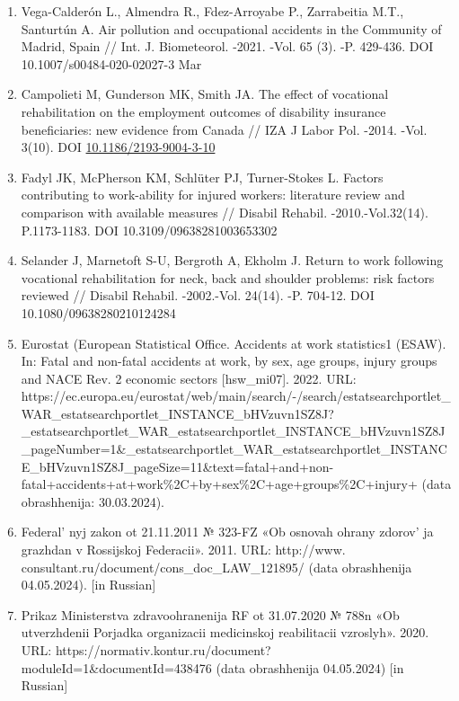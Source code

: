 \begin{references}
\begin{enumerate}
\def\labelenumi{\arabic{enumi}.}
\setcounter{enumi}{5}
\item
  Vega-Calderón L., Almendra R., Fdez-Arroyabe P., Zarrabeitia M.T.,
  Santurtún A. Air pollution and occupational accidents in the Community
  of Madrid, Spain // Int. J. Biometeorol. -2021. -Vol. 65 (3). -P.
  429-436. DOI 10.1007/s00484-020-02027-3 Mar
\item
  Campolieti M, Gunderson MK, Smith JA. The effect of vocational
  rehabilitation on the employment outcomes of disability insurance
  beneficiaries: new evidence from Canada // IZA J Labor Pol. -2014.
  -Vol. 3(10). DOI
  \href{http://dx.doi.org/10.1186/2193-9004-3-10}{10.1186/2193-9004-3-10}
\item
  Fadyl JK, McPherson KM, Schlüter PJ, Turner-Stokes L. Factors
  contributing to work-ability for injured workers: literature review
  and comparison with available measures // Disabil Rehabil.
  -2010.-Vol.32(14). P.1173-1183. DOI 10.3109/09638281003653302
\item
  Selander J, Marnetoft S-U, Bergroth A, Ekholm J. Return to work
  following vocational rehabilitation for neck, back and shoulder
  problems: risk factors reviewed // Disabil Rehabil. -2002.-Vol.
  24(14). -P. 704-12. DOI 10.1080/09638280210124284
\item
  Eurostat (European Statistical Office. Accidents at work statistics1
  (ESAW). In: Fatal and non-fatal accidents at work, by sex, age groups,
  injury groups and NACE Rev. 2 economic sectors {[}hsw\_mi07{]}. 2022.
  URL:
  https://ec.europa.eu/eurostat/web/main/search/-/search/estatsearchportlet\_WAR\_estatsearchportlet\_INSTANCE\_bHVzuvn1SZ8J?\_estatsearchportlet\_WAR\_estatsearchportlet\_INSTANCE\_bHVzuvn1SZ8J\_pageNumber=1\&\_estatsearchportlet\_WAR\_estatsearchportlet\_INSTANCE\_bHVzuvn1SZ8J\_pageSize=11\&text=fatal+and+non-fatal+accidents+at+work\%2C+by+sex\%2C+age+groups\%2C+injury+
  (data obrashhenija: 30.03.2024).
\item
  Federal' nyj zakon ot 21.11.2011 № 323-FZ «Ob osnovah
  ohrany zdorov' ja grazhdan v Rossijskoj Federacii».
  2011. URL: http://www. consultant.ru/document/cons\_doc\_LAW\_121895/
  (data obrashhenija 04.05.2024). {[}in Russian{]}
\item
  Prikaz Ministerstva zdravoohranenija RF ot 31.07.2020 № 788n «Ob
  utverzhdenii Porjadka organizacii medicinskoj reabilitacii vzroslyh».
  2020. URL:
  https://normativ.kontur.ru/document?moduleId=1\&documentId=438476
  (data obrashhenija 04.05.2024) {[}in Russian{]}

\end{enumerate}
\end{references}
